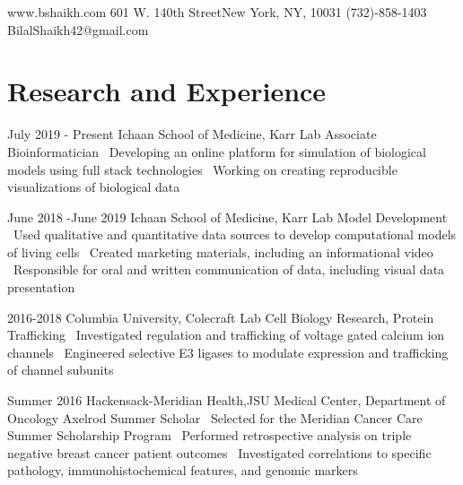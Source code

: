 \documentclass{bscv}
\begin{document}
 {} {www.bshaikh.com} {601 W. 140th Street\newline New York, NY, 10031} {(732)-858-1403} {BilalShaikh42@gmail.com}


\section{Research and Experience}

\begin{eventlist}

  \item{July 2019 - Present} 
  {Ichaan School of Medicine, Karr Lab}
  {Associate Bioinformatician}
  {\textbullet\ Developing an online platform for simulation of biological models using full stack technologies \newline \textbullet\ Working on creating reproducible visualizations of biological data}
 
\item{June 2018 -June 2019} 
  {Ichaan School of Medicine, Karr Lab}
  {Model Development}
  {\textbullet\ Used qualitative and quantitative data sources to develop computational models of living cells \newline \textbullet\ Created marketing materials, including an informational video \newline \textbullet\ Responsible for oral and written communication of data, including visual data presentation}
  

\item{2016-2018}
  {Columbia University, Colecraft Lab}
  {Cell Biology Research, Protein Trafficking}
  {\textbullet\  Investigated  regulation and trafficking of voltage gated calcium ion channels \newline \textbullet\  Engineered selective E3 ligases to modulate expression and trafficking of channel subunits}

\item{Summer 2016}
  {Hackensack-Meridian Health,\newline JSU Medical Center, Department of Oncology}
  {Axelrod Summer Scholar}
  {\textbullet\ Selected for the Meridian Cancer Care Summer Scholarship Program \newline \textbullet\ Performed retrospective analysis on triple negative breast cancer patient outcomes 
  \newline \textbullet\ Investigated correlations to specific pathology, immunohistochemical features, and genomic markers}


\end{eventlist}
\end{document}
